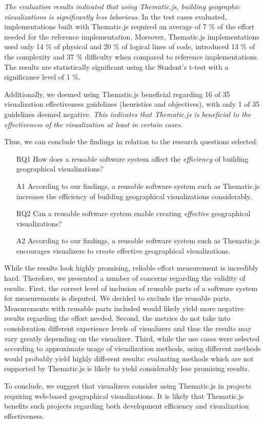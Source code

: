 \emph{The evaluation results indicated that using Thematic.js, building geographic visualizations is significantly less laborious.} In the test cases evaluated, implementations built with Thematic.js required an average of 7 \% of the effort needed for the reference implementation. Moreover, Thematic.js implementations used only 14 \% of physical and 20 \% of logical lines of code, introduced 13 \% of the complexity and 37 \% difficulty when compared to reference implementations. The results are statistically significant using the Student's t-test with a significance level of 1 \%.

Additionally, we deemed using Thematic.js beneficial regarding 16 of 35 visualization effectiveness guidelines (heuristics and objectives), with only 1 of 35 guidelines deemed negative. \emph{This indicates that Thematic.js is beneficial to the effectiveness of the visualization at least in certain cases.}

Thus, we can conclude the findings in relation to the research questions selected:%

\begin{enumerate}
	\item[RQ1] How does a reusable software system affect the \emph{efficiency} of building geographical visualizations?
	\item[A1] According to our findings, a reusable software system such as Thematic.js increases the efficiency of building geographical visualizations considerably.
\end{enumerate}
\begin{enumerate}
	\item[RQ2] Can a reusable software system enable creating \emph{effective} geographical visualizations?
	\item[A2] According to our findings, a reusable software system such as Thematic.js encourages visualizers to create effective geographical visualizations.
\end{enumerate}

While the results look highly promising, reliable effort measurement is incredibly hard. Therefore, we presented a number of concerns regarding the validity of results. First, the correct level of inclusion of reusable parts of a software system for measurements is disputed. We decided to exclude the reusable parts. Measurements with reusable parts included would likely yield more negative results regarding the effort needed. Second, the metrics do not take into consideration different experience levels of visualizers and thus the results may vary greatly depending on the visualizer. Third, while the use cases were selected according to approximate usage of visualization methods, using different methods would probably yield highly different results: evaluating methods which are not supported by Thematic.js is likely to yield considerably less promising results.

To conclude, we suggest that visualizers consider using Thematic.js in projects requiring web-based geographical visualizations. It is likely that Thematic.js benefits such projects regarding both development efficiency and visualization effectiveness.
